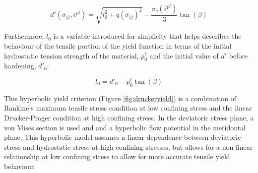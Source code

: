 \begin{equation}
d'\left(\bar{\sigma}_{ij}, \bar{\epsilon}^{pl}\right)=\sqrt{l_{0}^{2}+q\left(\bar{\sigma}_{ij}\right)^{2}}-\frac{\sigma_c\left(\bar{\epsilon}^{pl}\right)}{3}\tan\left(\beta\right)
\label{eqn:druc2-2}
\end{equation}

Furthermore, $l_0$ is a variable introduced for simplicity that helps describes the behaviour of the tensile portion of the yield function in terms of the initial hydrostatic tension strength of the material, $p_{0}^{t}$ and the initial value of $d'$ before hardening, $d'_{0}$: 

\begin{equation}
l_{0}=d'_{0}-p_{0}^{t}\tan\left(\beta\right)\label{eqn:druc2-1}
\end{equation}

This hyperbolic yield criterion (Figure \ref{fig:druckeryield}) is a combination of Rankine's maximum tensile stress condition at low confining stress and the linear Drucker-Prager condition at high confining stress. In the deviatoric stress plane, a von Mises section is used and and a hyperbolic flow potential in the meridontal plane. This hyperbolic model assumes a linear dependence between deviatoric stress and hydrostatic stress at high confining stresses, but allows for a non-linear relationship at low confining stress to allow for more accurate tensile yield behaviour.

